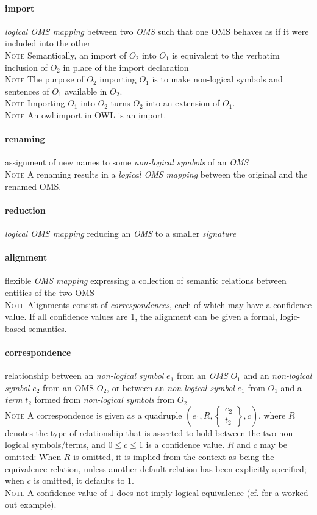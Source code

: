 \documentclass[10pt,%
\ifpretendfinal
final%
\else
draft%
\fi,
]{scrreprt}
\makeatletter
\newcommand*{\cf}{cf.\@\xspace}
\newcommand*{\termref}[1]{\textit{#1}}
\newcommand{\termdefinition}[2]{\paragraph{#1} #2}
\newenvironment{definitions}[0]{\medskip }{}
\newenvironment{note}[0]{\ \\ \textsc{Note} \quad}{}
\makeatother
\begin{document}
\begin{definitions}
  \termdefinition{import}{\termref{logical OMS mapping} between two
    \termref{OMS} such that one OMS behaves as if it were
    included into the other}
  \begin{note}
Semantically, an import of $O_2$ into $O_1$ is equivalent to the verbatim inclusion of $O_2$ in place of the import declaration
  \end{note}
  \begin{note}
    The purpose of $O_2$ importing $O_1$ is to make non-logical symbols and sentences of $O_1$ available in $O_2$.
  \end{note}
  \begin{note}
    Importing $O_1$ into $O_2$ turns $O_2$ into an extension of $O_1$.
  \end{note}
  \begin{note}
    An owl:import in OWL is an import.
  \end{note}
  
  \termdefinition{renaming}{assignment of new names
   to some \termref{non-logical symbols} of an \termref{OMS}}
\begin{note}
A renaming results in a \termref{logical OMS mapping} between the
original and the renamed OMS.
\end{note}
  \termdefinition{reduction}{\termref{logical OMS mapping} reducing an \termref{OMS} to a smaller \termref{signature}}

\termdefinition{alignment}{flexible \termref{OMS mapping} expressing a collection of semantic
relations between entities of the two OMS}
\begin{note}
Alignments consist of \termref{correspondences}, each of which may have a confidence value. If all
confidence values are 1, the alignment can be given a formal, logic-based semantics.
\end{note}

 \termdefinition{correspondence}{relationship between an \termref{non-logical symbol} $e_1$ from an \termref{OMS} $O_1$ and an \termref{non-logical symbol} $e_2$ from an OMS $O_2$, or between an \termref{non-logical symbol} $e_1$ from $O_1$ and a \termref{term} $t_2$ formed from \termref{non-logical symbols} from $O_2$
  \begin{note}
A correspondence is given as a quadruple 
$(e_1, R, \left\{\begin{array}{c}e_2\\ t_2\end{array}\right\}, c)$,
where $R$ denotes the type of relationship that is asserted to hold between the two non-logical 
symbols/terms, and $0\le c\le 1$ is a confidence value.  $R$ and $c$ may be omitted: When $R$ is 
omitted, it is implied from the context as being the equivalence relation, unless another default
relation has been explicitly specified; when $c$ is omitted, it defaults to $1$.}
  \end{note}
  \begin{note}
     A confidence value of $1$ does not imply logical equivalence (\cf \cite{KutzEtAl:ChineseWhispers2010} for a worked-out example).
  \end{note}


\end{definitions}
\end{document}
